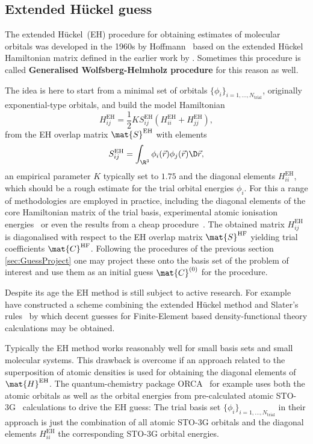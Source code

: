 \subsection{Extended Hückel guess}
The extended Hückel~(EH) procedure for obtaining estimates
of molecular orbitals was developed in the 1960s
by Hoffmann~\cite{Hoffmann1963}
based on the extended Hückel Hamiltonian matrix defined
in the earlier work by \citet{Wolfsberg1952}.
Sometimes this procedure is called
\textbf{Generalised Wolfsberg-Helmholz procedure}
for this reason as well.

The idea is here to start from a minimal set of orbitals
$\{\phi_i\}_{i=1,\ldots,N_\text{trial}}$,
originally exponential-type orbitals,
and build the model Hamiltonian
\[
	H_{ij}^\text{EH}
		= \frac12 K S^\text{EH}_{ij} \left( H_{ii}^\text{EH} + H_{jj}^\text{EH} \right),
\]
from the EH overlap matrix $\mat{S}^\text{EH}$ with elements
\[ S^\text{EH}_{ij} = \int_{\R^3} \phi_i(\vec{r}) \phi_j(\vec{r}) \D\vec{r}, \]
an empirical parameter $K$ typically set to $1.75$
and the diagonal elements $H_{ii}^\text{EH}$,
which should be a rough estimate for the trial orbital energies $\phi_i$.
For this a range of methodologies are employed in practice,
including the diagonal elements of the core Hamiltonian matrix
of the trial basis,
experimental atomic ionisation energies~\cite{Yamehmop}
or even the results from a cheap \SCF procedure~\cite{ORCA}.
The obtained matrix $H_{ij}^\text{EH}$ is diagonalised with respect
to the EH overlap matrix $\mat{S}^\text{HF}$
yielding trial coefficients $\mat{C}^\text{HF}$.
Following the procedures of the previous section \ref{sec:GuessProject}
one may project these onto the basis set of the problem of interest
and use them as an initial guess $\mat{C}^{(0)}$ for the \SCF procedure.

Despite its age the EH method is still subject to active research.
For example \citet{Lee2015} have constructed a scheme combining
the extended Hückel method and Slater's rules~\cite{Slater1930}
by which decent guesses for Finite-Element based density-functional theory
calculations may be obtained.

Typically the EH method works reasonably well
for small basis sets and small molecular systems.
This drawback is overcome if an approach related to the
superposition of atomic densities is used for obtaining the diagonal
elements of $\mat{H}^\text{EH}$.
The quantum-chemistry package ORCA~\cite{ORCA} for example
uses both the atomic orbitals as well as the orbital energies
from pre-calculated atomic STO-3G~\cite{Hehre1969} calculations
to drive the EH guess:
The trial basis set $\{\phi_i\}_{i=1,\ldots,N_\text{trial}}$
in their approach is just the combination of all atomic STO-3G orbitals
and the diagonal elements $H_{ii}^\text{EH}$ the corresponding STO-3G orbital energies.
